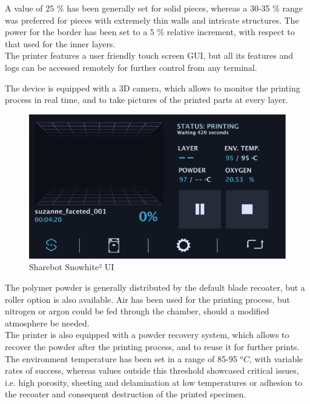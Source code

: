 \documentclass{article}
\begin{document}
          A value of 25 \% has been generally set for solid pieces, whereas a 30-35 \% range was preferred for pieces with extremely thin walls and intricate structures.  
          The power for the border has been set to a 5 \%  relative increment, with respect to that used for the inner layers. \\ 
  
          The printer features a user friendly touch screen GUI, but all its features and logs can be accessed remotely for further control from any terminal.  
  
          The device is equipped with a 3D camera, which allows to monitor the printing process in real time, 
          and to take pictures of the printed parts at every layer. \\
  
          \begin{figure}[h!]
              \centering
              \includegraphics[width=\textwidth]{Pictures/Sharebot_GUI.pdf}
              \caption{Sharebot Snowhite² UI}
              \label{fig:Sharebot_UI}
          \end{figure}
  
          The polymer powder is generally distributed by the default blade recoater, but a roller option is also available. 
          Air has been used for the printing process, but nitrogen or argon could be fed through the chamber, 
          should a modified atmosphere be needed.  \\
  
          The printer is also equipped with a powder recovery system, which allows to recover the powder 
          after the printing process, and to reuse it for further prints. \\ 
  
          The environment temperature has been set in a range of 85-95 $^oC$, with variable rates of success, 
          whereas values outside this threshold showcased critical issues, i.e. high porosity, sheeting and 
          delamination at low temperatures or adhesion to the recoater and consequent destruction of the printed specimen. \\ 
  
\end{document}
